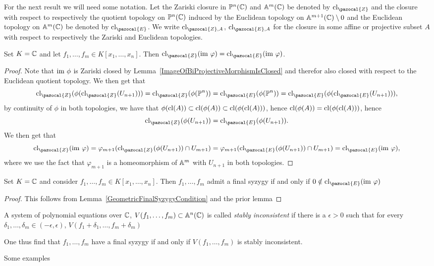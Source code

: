         For the next result we will need some notation. Let the Zariski closure in $\mathbb{P}^n(\mathbb{C})$ and $\mathbb{A}^m(\mathbb{C})$ be denoted by $\cl_{\pazocal{Z}}$ and the closure with respect to respectively the quotient topology on $\mathbb{P}^{n}(\mathbb{C})$ induced by the Euclidean topology on $\mathbb{A}^{m+1}(\mathbb{C})\setminus 0$ and the Euclidean topology on $\mathbb{A}^m(\mathbb{C})$ be denoted by $\cl_{\pazocal{E}}$. We write $\cl_{\pazocal{Z},A}$, $\cl_{\pazocal{E},A}$ for the closure in some affine or projective subset $A$ with respect to respectively the Zariski and Euclidean topologies.
        \begin{lemma}
            Set $K=\mathbb{C}$ and let $f_1,\dots,f_m\in K[x_1,\dots,x_n]$. Then $\cl_{\pazocal{Z}}(\im \ \varphi) = \cl_{\pazocal{E}}(\im \ \varphi)$.
        \end{lemma}
        \begin{proof}
            Note that $\im\ \phi$ is Zariski closed by Lemma~\ref{ImageOfBiProjectiveMorphismIsClosed} and therefor also closed with respect to the Euclidean quotient topology. We then get that 
            $$\cl_{\pazocal{Z}}(\phi(\cl_{\pazocal{Z}}(U_{n+1})))=\cl_{\pazocal{Z}}(\phi(\Pp^n))=\cl_{\pazocal{E}}(\phi(\Pp^n))=\cl_{\pazocal{E}}(\phi(\cl_{\pazocal{E}}(U_{n+1}))),$$
            by continuity of $\phi$ in both topologies, we have that $\phi(\mathrm{cl}(A))\subset \mathrm{cl}(\phi(A))\subset \mathrm{cl}(\phi(\mathrm{cl}(A)))$, hence $\mathrm{cl}(\phi(A))=\mathrm{cl}(\phi(\mathrm{cl}(A)))$, hence 
            $$\cl_{\pazocal{Z}}(\phi(U_{n+1}))=\cl_{\pazocal{E}}(\phi(U_{n+1})).$$
            We then get that 
            $$\cl_{\pazocal{Z}}(\im \ \varphi) = \varphi_{m+1}(\cl_{\pazocal{Z}}(\phi(U_{n+1}))\cap U_{m+1}) = \varphi_{m+1}(\cl_{\pazocal{E}}(\phi(U_{n+1}))\cap U_{m+1})= \cl_{\pazocal{E}}(\im \ \varphi),$$
            where we use the fact that $\varphi_{m+1}$ is a homeomorphism of $\mathbb{A}^m$ with $U_{n+1}$ in both topologies.
        \end{proof}
        \begin{theorem}
            Set $K=\mathbb{C}$ and consider $f_1,\dots,f_m\in K[x_1,\dots,x_n]$. Then $f_1,\dots,f_m$ admit a final syzygy if and only if $0\notin \cl_{\pazocal{E}}(\im \ \varphi)$
        \end{theorem}
        \begin{proof}
            This follows from Lemma~\ref{GeometricFinalSyzygyCondition} and the prior lemma
        \end{proof}
        \begin{definition}
            A system of polynomial equations over $\mathbb{C}$, $V(f_1,\dots,f_m)\subset \mathbb{A}^n(\mathbb{C})$ is called \textit{stably inconsistent} if there is a $\epsilon>0$ such that for every $\delta_1,\dots,\delta_m \in (-\epsilon,\epsilon)$, $V(f_1+\delta_1,\dots,f_m+\delta_m)$
        \end{definition}
        \begin{remark}
            One thus find that $f_1,\dots,f_m$ have a final syzygy if and only if $V(f_1,\dots,f_m)$ is stably inconsistent.
        \end{remark}
        \begin{example}
            {\Large Some examples}
        \end{example}
